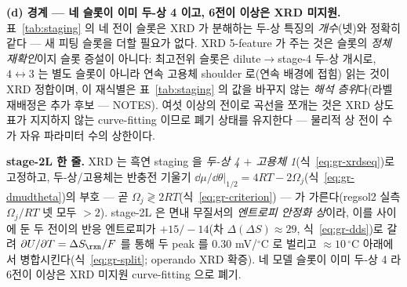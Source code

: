 \textbf{(d) 경계 --- 네 슬롯이 이미 두-상 4 이고, 6전이 이상은 XRD 미지원.} 표~\ref{tab:staging} 의 네 전이 슬롯은
XRD 가 분해하는 두-상 특징의 \emph{개수}(넷)와 정확히 같다 --- 새 피팅 슬롯을 더할 필요가 없다. XRD 5-feature 가
주는 것은 슬롯의 \emph{정체 재확인}이지 슬롯 증설이 아니다: 최고전위 슬롯은 dilute$\to$stage-4 두-상 개시로,
$4\!\leftrightarrow\!3$ 는 별도 슬롯이 아니라 연속 고용체 shoulder 로(연속 배경에 접힘) 읽는 것이 XRD 정합이며, 이
재식별은 표~\ref{tab:staging} 의 값을 바꾸지 않는 \emph{해석 층위}다(라벨 재배정은 추가 후보 --- NOTES). 여섯 이상의
전이로 곡선을 쪼개는 것은 XRD 상도표가 지지하지 않는 curve-fitting 이므로 폐기 상태를 유지한다 --- 물리적 상 전이
수가 자유 파라미터 수의 상한이다.

\begin{keybox}
\textbf{stage-2L 한 줄.} XRD 는 흑연 staging 을 \emph{두-상 4 $+$ 고용체 1}(식~\eqref{eq:gr-xrdseq})로 고정하고,
두-상/고용체는 반충전 기울기 $\dd\mu/\dd\theta|_{1/2}=4RT-2\Omega_j$(식~\eqref{eq:gr-dmudtheta})의 부호 --- 곧
$\Omega_j\!\gtrless\!2RT$(식~\eqref{eq:gr-criterion}) --- 가 가른다(regsol2 실측 $\Omega_j/RT$ 넷 모두 $>2$). stage-2L 은
면내 무질서의 \emph{엔트로피 안정화 상}이라, 이를 사이에 둔 두 전이의 반응 엔트로피가 $+15/-14$(차
$\Delta(\Delta S)\!\approx\!29$, 식~\eqref{eq:gr-dds})로 갈려 $\partial U/\partial T=\Delta S_{\rxn}/F$ 를 통해 두 peak 를
$0.30$ mV/$^\circ$C 로 벌리고 $\approx10\,^\circ$C 아래에서 병합시킨다(식~\eqref{eq:gr-split}; operando XRD
확증\cite{schmitt2022}). 네 모델 슬롯이 이미 두-상 4 라 6전이 이상은 XRD 미지원 curve-fitting 으로 폐기.
\end{keybox}

